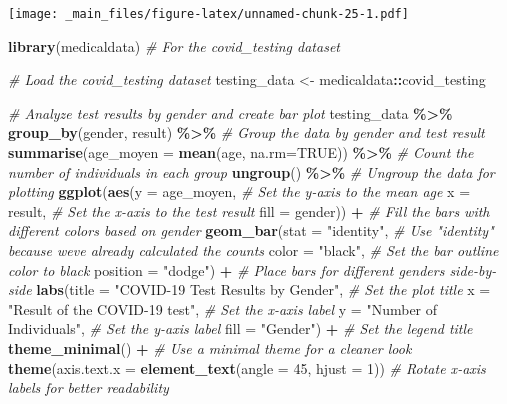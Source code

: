 \documentclass[
]{book}
\newenvironment{Shaded}{\begin{snugshade}}{\end{snugshade}}
\newcommand{\AttributeTok}[1]{\textcolor[rgb]{0.13,0.29,0.53}{#1}}
\newcommand{\CommentTok}[1]{\textcolor[rgb]{0.56,0.35,0.01}{\textit{#1}}}
\newcommand{\ConstantTok}[1]{\textcolor[rgb]{0.56,0.35,0.01}{#1}}
\newcommand{\DecValTok}[1]{\textcolor[rgb]{0.00,0.00,0.81}{#1}}
\newcommand{\FunctionTok}[1]{\textcolor[rgb]{0.13,0.29,0.53}{\textbf{#1}}}
\newcommand{\NormalTok}[1]{#1}
\newcommand{\OtherTok}[1]{\textcolor[rgb]{0.56,0.35,0.01}{#1}}
\newcommand{\SpecialCharTok}[1]{\textcolor[rgb]{0.81,0.36,0.00}{\textbf{#1}}}
\newcommand{\StringTok}[1]{\textcolor[rgb]{0.31,0.60,0.02}{#1}}
\begin{document}
\texttt{[image: \_main\_files/figure-latex/unnamed-chunk-25-1.pdf]}

\begin{Shaded}
\begin{Highlighting}[]
\FunctionTok{library}\NormalTok{(medicaldata) }\CommentTok{\# For the covid\_testing dataset}

\CommentTok{\# Load the covid\_testing dataset}
\NormalTok{testing\_data }\OtherTok{\textless{}{-}}\NormalTok{ medicaldata}\SpecialCharTok{::}\NormalTok{covid\_testing}

\CommentTok{\# Analyze test results by gender and create bar plot}
\NormalTok{testing\_data }\SpecialCharTok{\%\textgreater{}\%}
  \FunctionTok{group\_by}\NormalTok{(gender, result) }\SpecialCharTok{\%\textgreater{}\%} \CommentTok{\# Group the data by gender and test result}
  \FunctionTok{summarise}\NormalTok{(}\AttributeTok{age\_moyen =} \FunctionTok{mean}\NormalTok{(age, }\AttributeTok{na.rm=}\ConstantTok{TRUE}\NormalTok{)) }\SpecialCharTok{\%\textgreater{}\%} \CommentTok{\# Count the number of individuals in each group}
  \FunctionTok{ungroup}\NormalTok{() }\SpecialCharTok{\%\textgreater{}\%} \CommentTok{\# Ungroup the data for plotting}
  \FunctionTok{ggplot}\NormalTok{(}\FunctionTok{aes}\NormalTok{(}\AttributeTok{y =}\NormalTok{ age\_moyen, }\CommentTok{\# Set the y{-}axis to the mean age}
             \AttributeTok{x =}\NormalTok{ result, }\CommentTok{\# Set the x{-}axis to the test result}
             \AttributeTok{fill =}\NormalTok{ gender)) }\SpecialCharTok{+} \CommentTok{\# Fill the bars with different colors based on gender}
  \FunctionTok{geom\_bar}\NormalTok{(}\AttributeTok{stat =} \StringTok{"identity"}\NormalTok{, }\CommentTok{\# Use "identity" because we\textquotesingle{}ve already calculated the counts}
           \AttributeTok{color =} \StringTok{"black"}\NormalTok{, }\CommentTok{\# Set the bar outline color to black}
           \AttributeTok{position =} \StringTok{"dodge"}\NormalTok{) }\SpecialCharTok{+} \CommentTok{\# Place bars for different genders side{-}by{-}side}
  \FunctionTok{labs}\NormalTok{(}\AttributeTok{title =} \StringTok{"COVID{-}19 Test Results by Gender"}\NormalTok{, }\CommentTok{\# Set the plot title}
       \AttributeTok{x =} \StringTok{"Result of the COVID{-}19 test"}\NormalTok{, }\CommentTok{\# Set the x{-}axis label}
       \AttributeTok{y =} \StringTok{"Number of Individuals"}\NormalTok{, }\CommentTok{\# Set the y{-}axis label}
       \AttributeTok{fill =} \StringTok{"Gender"}\NormalTok{) }\SpecialCharTok{+} \CommentTok{\# Set the legend title}
  \FunctionTok{theme\_minimal}\NormalTok{() }\SpecialCharTok{+} \CommentTok{\# Use a minimal theme for a cleaner look}
  \FunctionTok{theme}\NormalTok{(}\AttributeTok{axis.text.x =} \FunctionTok{element\_text}\NormalTok{(}\AttributeTok{angle =} \DecValTok{45}\NormalTok{, }\AttributeTok{hjust =} \DecValTok{1}\NormalTok{)) }\CommentTok{\# Rotate x{-}axis labels for better readability}
\end{Highlighting}
\end{Shaded}
\end{document}
